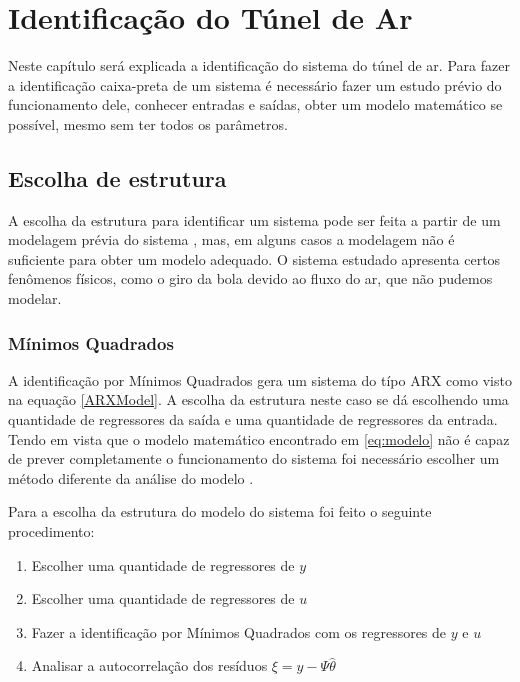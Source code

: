 \chapter{Identificação do Túnel de Ar} \label{cap4}


Neste capítulo  será explicada a identificação do sistema do túnel de ar. Para fazer a identificação caixa-preta de um sistema é necessário fazer um estudo prévio do funcionamento dele, conhecer entradas e saídas, obter um modelo matemático se possível, mesmo sem ter todos os parâmetros.
\section{Escolha de estrutura}
A escolha da estrutura para identificar um sistema pode ser feita a partir de um modelagem prévia do sistema  , mas, em alguns casos a modelagem não é suficiente para obter um modelo adequado. O sistema estudado apresenta certos fenômenos físicos, como o giro da bola devido ao fluxo do ar, que não pudemos modelar.
\subsection{Mínimos Quadrados}\label{s:4mq}
A identificação por Mínimos Quadrados gera um sistema do típo ARX como visto na equação \ref{ARXModel}. A escolha da estrutura neste caso se dá escolhendo uma quantidade de regressores da saída e uma quantidade de regressores da entrada. Tendo em vista que o modelo matemático encontrado em \ref{eq:modelo} não é capaz de prever completamente o funcionamento do sistema foi necessário escolher um método diferente da análise do modelo .


Para a escolha da estrutura do modelo do sistema foi feito o seguinte procedimento:
\begin{enumerate}
	\item Escolher uma quantidade de regressores de $y$
	\item Escolher uma quantidade de regressores de $u$
	\item Fazer a identificação por Mínimos Quadrados com os regressores de $y$ e $u$
	\item Analisar a autocorrelação dos resíduos $\xi=y-\Psi \hat{\theta}$
\end{enumerate}

